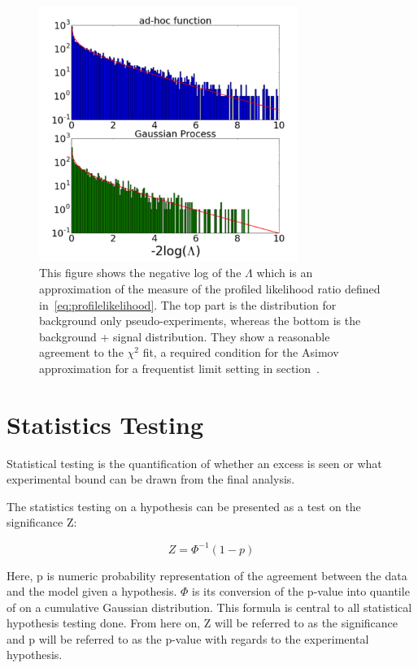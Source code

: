     \begin{figure}[!htb]
        \begin{center}
            \includegraphics[width=0.75\textwidth]{figures/chapter_analysismethod/chi2}
                \caption{
                This figure shows the negative log of the $\Lambda$ which is an approximation of the measure of the profiled likelihood ratio defined in~\ref{eq:profilelikelihood}. The top part is the distribution for background only pseudo-experiments, whereas the bottom is the background + signal distribution. They show a reasonable agreement to the $\chi^{2}$ fit, a required condition for the Asimov approximation for a frequentist limit setting in
            section~\cite{frate2017modelling}. }
            \label{fig:chi2}
        \end{center}
    \end{figure}
    \FloatBarrier

\section{Statistics Testing}
\label{section:stats}
Statistical testing is the quantification of whether an excess is seen or what experimental bound can be drawn from the final analysis. 

The statistics testing on a hypothesis can be presented as a test on the significance Z: 

\begin{equation}
 Z= \Phi^{-1}(1-p) 
 \label{eq:significance}
\end{equation}

Here, p is numeric probability representation of the agreement between the data and the model given a hypothesis. $\Phi$ is its conversion of the p-value into quantile of on a cumulative Gaussian distribution. This formula is central to all statistical hypothesis testing done. From here on, Z will be referred to as the significance and p will be referred to as the p-value with regards to the experimental hypothesis. 

